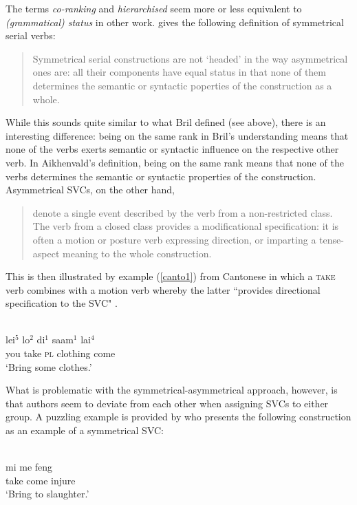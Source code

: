 The terms \textit{co-ranking} and \textit{hierarchised} seem more or less equivalent to \textit{(grammatical) status} in other work. \citet[22]{Aikhenvald2006} gives the following definition of symmetrical serial verbs:

\begin{quote}Symmetrical serial constructions are not `headed' in the way asymmetrical ones are: all their components have equal status in that none of them determines the semantic or syntactic poperties of the construction as a whole.\end{quote}

While this sounds quite similar to what Bril defined (see above), there is an interesting difference: being on the same rank in Bril's understanding means that none of the verbs exerts semantic or syntactic influence on the respective other verb. In Aikhenvald's definition, being on the same rank means that none of the verbs determines the semantic or syntactic properties of the construction. Asymmetrical SVCs, on the other hand, 

\begin{quote}denote a single event described by the verb from a non-restricted class. The verb from a closed class provides a modificational specification: it is often a motion or posture verb expressing direction, or imparting a tense-aspect meaning to the whole construction. \citep[22]{Aikhenvald2006}\end{quote} 

This is then illustrated by example (\ref{canto1}) from Cantonese in which a \textsc{take} verb combines with a motion verb whereby the latter ``provides directional specification to the SVC" \citep[22]{Aikhenvald2006}.

\ea \label{canto1}
\\
\gll lei$^5$ lo$^2$ di$^1$ saam$^1$ lai$^4$ \\
you take \textsc{pl} clothing come \\
\glft `Bring some clothes.'\\ 
\z

What is problematic with the symmetrical-asymmetrical approach, however, is that authors seem to deviate from each other when assigning SVCs to either group. A puzzling example is provided by \citet{kratochvil2007grammar} who presents the following construction as an example of a symmetrical SVC:

\ea 
{}\\
\gll mi me feng \\
 take come injure \\
\glft `Bring to slaughter.' \\ 
\z

